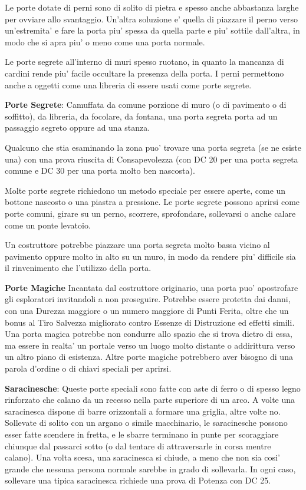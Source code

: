 \documentclass[a4paper,11pt,twoside,openany]{book}
\begin{document}
Le porte dotate di perni sono di solito di pietra e spesso anche abbastanza larghe per ovviare allo svantaggio. Un'altra soluzione e' quella di piazzare il perno verso un'estremita' e fare la porta piu' spessa da quella parte e piu' sottile dall'altra, in modo che si apra piu' o meno come una porta normale.

Le porte segrete all'interno di muri spesso ruotano, in quanto la mancanza di cardini rende piu' facile occultare la presenza della porta. I perni permettono anche a oggetti come una libreria di essere usati come porte segrete.

\textbf{Porte Segrete}: Camuffata da comune porzione di muro (o di pavimento o di soffitto), da libreria, da focolare, da fontana, una porta segreta porta ad un passaggio segreto oppure ad una stanza.

Qualcuno che stia esaminando la zona puo' trovare una porta segreta (se ne esiste una) con una prova riuscita di Consapevolezza (con DC 20 per una porta segreta comune e DC 30 per una porta molto ben nascosta).

Molte porte segrete richiedono un metodo speciale per essere aperte, come un bottone nascosto o una piastra a pressione. Le porte segrete possono aprirsi come porte comuni, girare su un perno, scorrere, sprofondare, sollevarsi o anche calare come un ponte levatoio.

Un costruttore potrebbe piazzare una porta segreta molto bassa vicino al pavimento oppure molto in alto su un muro, in modo da rendere piu' difficile sia il rinvenimento che l'utilizzo della porta.

\textbf{Porte Magiche} Incantata dal costruttore originario, una porta puo' apostrofare gli esploratori invitandoli a non proseguire. Potrebbe essere protetta dai danni, con una Durezza maggiore o un numero maggiore di Punti Ferita, oltre che un bonus al Tiro Salvezza migliorato contro Essenze di Distruzione ed effetti simili. Una porta magica potrebbe non condurre allo spazio che si trova dietro di essa, ma essere in realta' un portale verso un luogo molto distante o addirittura verso un altro piano di esistenza. Altre porte magiche potrebbero aver bisogno di una parola d'ordine o di chiavi speciali per aprirsi.

\textbf{Saracinesche}: Queste porte speciali sono fatte con aste di ferro o di spesso legno rinforzato che calano da un recesso nella parte superiore di un arco. A volte una saracinesca dispone di barre orizzontali a formare una griglia, altre volte no. Sollevate di solito con un argano o simile macchinario, le saracinesche possono esser fatte scendere in fretta, e le sbarre terminano in punte per scoraggiare chiunque dal passarci sotto (o dal tentare di attraversarle in corsa mentre calano). Una volta scesa, una saracinesca si chiude, a meno che non sia cosi' grande che nessuna persona normale sarebbe in grado di sollevarla. In ogni caso, sollevare una tipica saracinesca richiede una prova di Potenza con DC 25.
\end{document}
